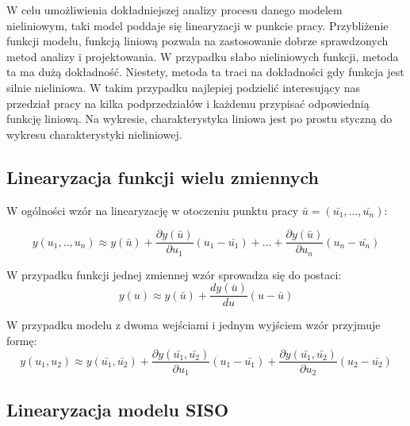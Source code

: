 \documentclass[11pt,a4paper]{article}
\begin{document}
\indent \indent W celu umożliwienia dokładniejszej analizy procesu danego modelem nieliniowym, taki model poddaje się linearyzacji w punkcie pracy. Przybliżenie funkcji modelu, funkcją liniową pozwala na zastosowanie dobrze sprawdzonych metod analizy i projektowania. W przypadku słabo nieliniowych funkcji, metoda ta ma dużą dokładność. Niestety, metoda ta traci na dokładności gdy funkcja jest silnie nieliniowa. W takim przypadku najlepiej podzielić interesujący nas przedział pracy na kilka podprzedziałów i każdemu przypisać odpowiednią funkcję liniową. Na wykresie, charakterystyka liniowa jest po prostu styczną do wykresu charakterystyki nieliniowej.

\subsection{Linearyzacja funkcji wielu zmiennych}
\indent W ogólności wzór na linearyzację w otoczeniu punktu pracy $\bar{u} = (\bar{u_{1}}, ... , \bar{u_{n}})$: 

\begin{equation}
	y(u_{1}, .., u_{n}) \approx y(\bar{u}) + \frac{\partial y(\bar{u})}{\partial u_{1}}(u_{1} - \bar{u_{1}}) + ... + \frac{\partial y(\bar{u})}{\partial u_{n}}(u_{n} - \bar{u_{n}})
	\label{eqn:wzor3}
\end{equation}

W przypadku funkcji jednej zmiennej wzór sprowadza się do postaci: 
\begin{equation}
	y(u) \approx y(\bar{u}) + \frac{dy(\bar{u})}{du}(u - \bar{u})
	\label{eqn:wzor4}
\end{equation}

W przypadku modelu z dwoma wejściami i jednym wyjściem wzór przyjmuje formę:
\begin{equation}
	y(u_{1}, u_{2}) \approx y(\bar{u_{1}}, \bar{u_{2}}) + \frac{\partial y(\bar{u_{1}}, \bar{u_{2}})}{\partial u_{1}}(u_{1} - \bar{u_{1}}) +  \frac{\partial y(\bar{u_{1}}, \bar{u_{2}})}{\partial u_{2}}(u_{2} - \bar{u_{2}})
	\label{eqn:wzor5}
\end{equation}

\subsection{Linearyzacja modelu SISO}
\end{document}
